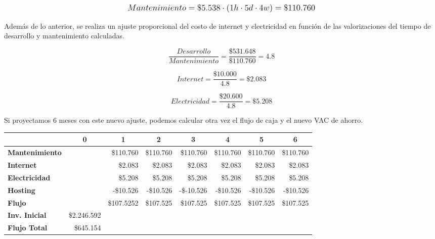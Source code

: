 \[
\mathlarger{
	Mantenimiento = \$5.538 \cdot \left(1h\cdot5d\cdot4w\right) = \$110.760
}
\]

Además de lo anterior, se realiza un ajuste proporcional del costo de internet y electricidad en función de las valorizaciones del tiempo de desarrollo y mantenimiento calculadas.

\[
\frac{Desarrollo}{Mantenimiento} = \frac{\$531.648}{\$110.760} = 4.8
\]

\[
Internet = \frac{\$10.000}{4.8} = \$2.083
\]

\[
Electricidad = \frac{\$20.600}{4.8} = \$5.208
\]

Si proyectamos 6 meses con este nuevo ajuste, podemos calcular otra vez el flujo de caja y el nuevo VAC de ahorro.

\begin{center}
	\begin{tabular}{ | l | l | l | l | l | l | l | l |}
		\hline
		& \multicolumn{1}{|c|}{\textbf{0}} & \multicolumn{1}{|c|}{\textbf{1}} & \multicolumn{1}{|c|}{\textbf{2}} & \multicolumn{1}{|c|}{\textbf{3}} & \multicolumn{1}{|c|}{\textbf{4}} & \multicolumn{1}{|c|}{\textbf{5}} & \multicolumn{1}{|c|}{\textbf{6}} \\
		\hline
		{\textbf{Mantenimiento}} &  & \multicolumn{1}{|r|}{\$110.760} & \multicolumn{1}{|r|}{\$110.760} & \multicolumn{1}{|r|}{\$110.760} & \multicolumn{1}{|r|}{\$110.760} & \multicolumn{1}{|r|}{\$110.760} & \multicolumn{1}{|r|}{\$110.760} \\ \hline
		
		{\textbf{Internet}} &  & \multicolumn{1}{|r|}{\$2.083} & \multicolumn{1}{|r|}{\$2.083} & \multicolumn{1}{|r|}{\$2.083} & \multicolumn{1}{|r|}{\$2.083} & \multicolumn{1}{|r|}{\$2.083} & \multicolumn{1}{|r|}{\$2.083} \\ \hline
		
		{\textbf{Electricidad}} &  & \multicolumn{1}{|r|}{\$5.208} & \multicolumn{1}{|r|}{\$5.208} & \multicolumn{1}{|r|}{\$5.208} & \multicolumn{1}{|r|}{\$5.208} & \multicolumn{1}{|r|}{\$5.208} & \multicolumn{1}{|r|}{\$5.208} \\ \hline
		
		{\textbf{Hosting}} &  & \multicolumn{1}{|r|}{-\$10.526} & \multicolumn{1}{|r|}{-\$10.526} & \multicolumn{1}{|r|}{-\$-10.526} & \multicolumn{1}{|r|}{-\$10.526} & \multicolumn{1}{|r|}{-\$10.526} & \multicolumn{1}{|r|}{-\$10.526} \\ \hline
		
		{\textbf{Flujo}} &  & \multicolumn{1}{|r|}{\$107.5252} & \multicolumn{1}{|r|}{\$107.525} & \multicolumn{1}{|r|}{\$107.525} & \multicolumn{1}{|r|}{\$107.525} & \multicolumn{1}{|r|}{\$107.525} & \multicolumn{1}{|r|}{\$107.525} \\ \hline
		{\textbf{Inv. Inicial}} & \multicolumn{1}{|r|}{\$2.246.592} & & & & & & \\ \hline
		\textbf{Flujo Total} & \multicolumn{1}{|r|}{\$645.154} & & & & & & \\ \hline
	\end{tabular}
\end{center}

